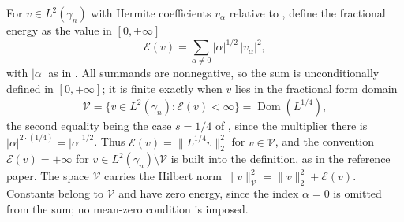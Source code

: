 \begin{definition}
For $v \in L^2(\gamma_n)$ with Hermite coefficients $v_\alpha$ relative to
, define the fractional energy as the value in
$[0,+\infty]$
\[
  \mathcal{E}(v) = \sum_{\alpha \neq 0} |\alpha|^{1/2}\, |v_\alpha|^2 ,
\]
with $|\alpha|$ as in .  All summands are nonnegative, so
the sum is unconditionally defined in $[0,+\infty]$; it is finite exactly when
$v$ lies in the fractional form domain
\[
  \mathcal{V} = \{v \in L^2(\gamma_n) : \mathcal{E}(v) < \infty\}
    = \operatorname{Dom}(L^{1/4}) ,
\]
the second equality being the case $s = 1/4$ of , since
the multiplier there is $|\alpha|^{2\cdot(1/4)} = |\alpha|^{1/2}$.  Thus
$\mathcal{E}(v) = \|L^{1/4}v\|_2^2$ for $v \in \mathcal{V}$, and the convention
$\mathcal{E}(v) = +\infty$ for $v \in L^2(\gamma_n)\setminus\mathcal{V}$ is built
into the definition, as in the reference paper.  The space $\mathcal{V}$ carries
the Hilbert norm $\|v\|_{\mathcal{V}}^2 = \|v\|_2^2 + \mathcal{E}(v)$.  Constants
belong to $\mathcal{V}$ and have zero energy, since the index $\alpha = 0$ is
omitted from the sum; no mean-zero condition is imposed.
\end{definition}
